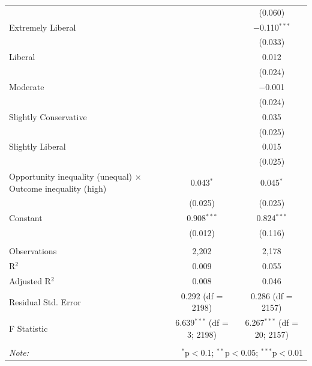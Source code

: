 \begin{table}[H]
\begin{tabular}{@{\extracolsep{5pt}}lcc}
  &  & (0.060) \\ 
  Extremely Liberal &  & $-$0.110$^{***}$ \\ 
  &  & (0.033) \\ 
  Liberal &  & 0.012 \\ 
  &  & (0.024) \\ 
  Moderate &  & $-$0.001 \\ 
  &  & (0.024) \\ 
  Slightly Conservative &  & 0.035 \\ 
  &  & (0.025) \\ 
  Slightly Liberal &  & 0.015 \\ 
  &  & (0.025) \\ 
  Opportunity inequality (unequal) × Outcome inequality (high) & 0.043$^{*}$ & 0.045$^{*}$ \\ 
  & (0.025) & (0.025) \\ 
  Constant & 0.908$^{***}$ & 0.824$^{***}$ \\ 
  & (0.012) & (0.116) \\ 
 \hline \\[-1.8ex] 
Observations & 2,202 & 2,178 \\ 
R$^{2}$ & 0.009 & 0.055 \\ 
Adjusted R$^{2}$ & 0.008 & 0.046 \\ 
Residual Std. Error & 0.292 (df = 2198) & 0.286 (df = 2157) \\ 
F Statistic & 6.639$^{***}$ (df = 3; 2198) & 6.267$^{***}$ (df = 20; 2157) \\ 
\hline 
\hline \\[-1.8ex] 
\textit{Note:}  & \multicolumn{2}{r}{$^{*}$p$<$0.1; $^{**}$p$<$0.05; $^{***}$p$<$0.01} \\ 
\end{tabular} 
\end{table} 
